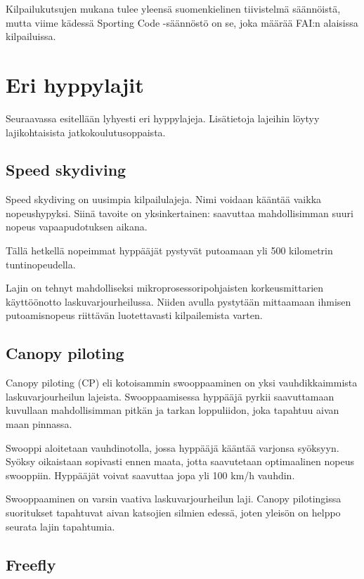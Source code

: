 Kilpailukutsujen mukana tulee yleensä suomenkielinen tiivistelmä säännöistä, mutta viime kädessä Sporting Code -säännöstö on se, joka määrää FAI:n alaisissa kilpailuissa. 

\section{ Eri hyppylajit}
\label{erikoishypyt-eri-hyppylajit}


Seuraavassa esitellään lyhyesti eri hyppylajeja. Lisätietoja lajeihin löytyy lajikohtaisista jatkokoulutusoppaista. 

\subsection{ Speed skydiving }
\label{erikoishypyt-speed-skydiving}


Speed skydiving on uusimpia kilpailulajeja. Nimi voidaan kääntää vaikka nopeushypyksi. Siinä tavoite on yksinkertainen: saavuttaa mahdollisimman suuri nopeus vapaapudotuksen aikana. 


Tällä hetkellä nopeimmat hyppääjät pystyvät putoamaan yli 500 kilometrin tuntinopeudella. 


Lajin on tehnyt mahdolliseksi mikroprosessoripohjaisten korkeusmittarien käyttöönotto laskuvarjourheilussa. Niiden avulla pystytään mittaamaan ihmisen putoamisnopeus riittävän luotettavasti kilpailemista varten. 

\subsection{ Canopy piloting }
\label{erikoishypyt-canopy-piloting}


Canopy piloting (CP) eli kotoisammin swooppaaminen on yksi vauhdikkaimmista laskuvarjourheilun lajeista. Swooppaamisessa hyppääjä pyrkii saavuttamaan kuvullaan mahdollisimman pitkän ja tarkan loppuliidon, joka tapahtuu aivan maan pinnassa. 


Swooppi aloitetaan vauhdinotolla, jossa hyppääjä kääntää varjonsa syöksyyn. Syöksy oikaistaan sopivasti ennen maata, jotta saavutetaan optimaalinen nopeus swooppiin. Hyppääjät voivat saavuttaa jopa yli 100 km/h vauhdin. 


Swooppaaminen on varsin vaativa laskuvarjourheilun laji. Canopy pilotingissa suoritukset tapahtuvat aivan katsojien silmien edessä, joten yleisön on helppo seurata lajin tapahtumia. 

\subsection{ Freefly }
\label{erikoishypyt-freefly}


